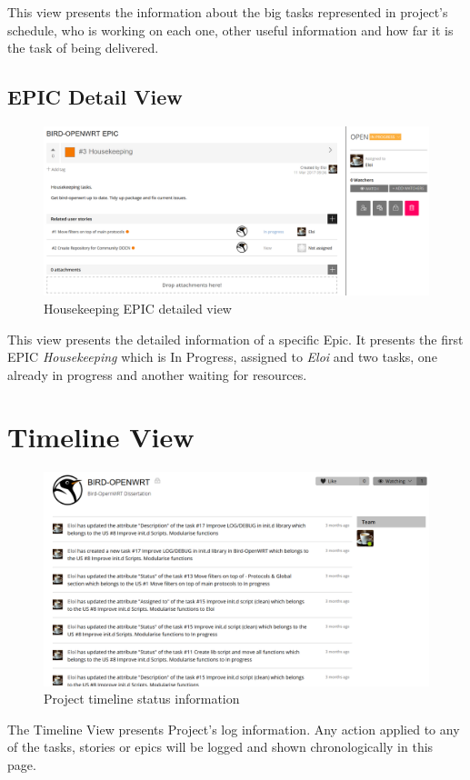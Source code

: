 \begin{appendices}
\begin{landscape}
This view presents the information about the big tasks represented in project's schedule, who is working on each one, other useful information and how far it is the task of being delivered.
\newpage

\subsection{EPIC Detail View}
\begin{figure}[h!]
\centering
    \includegraphics[width=0.85\hsize]{images/kanban/epic-details}
    \caption{Housekeeping EPIC detailed view}
    \label{fig:kepicd}
\end{figure}
This view presents the detailed information of a specific Epic. It presents the first EPIC \textit{Housekeeping} which is In Progress, assigned to \textit{Eloi} and two tasks, one already in progress and another waiting for resources.
\newpage

\section{Timeline View}
\begin{figure}[h!]
\centering
    \includegraphics[width=0.7\hsize]{images/kanban/timeline}
    \caption{Project timeline status information}
    \label{fig:ktimeline}
\end{figure}
The Timeline View presents Project's log information. Any action applied to any of the tasks, stories or epics will be logged and shown chronologically in this page.
\newpage


\end{landscape}
\end{appendices}
